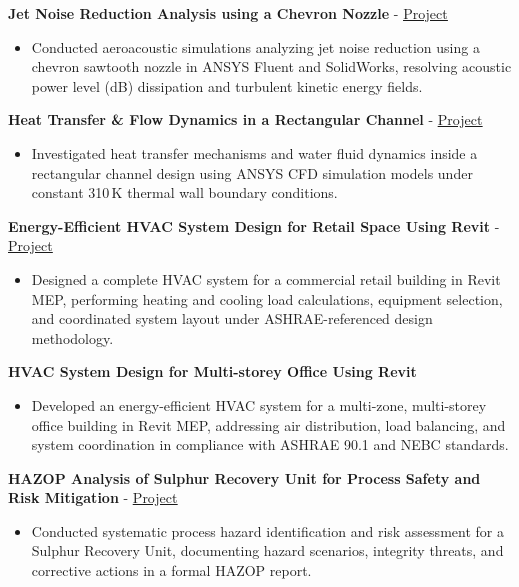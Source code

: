 \documentclass[10pt, letterpaper]{article}
\newcommand{\projhead}[1]{\vspace{5pt}\textbf{#1}\par\vspace{1pt}}
\newcommand{\projheadlink}[3]{\vspace{5pt}\textbf{#1} - \href{#3}{\textcolor{linkblue}{\underline{#2}}}\par\vspace{1pt}}
\begin{document}
\projheadlink{Jet Noise Reduction Analysis using a Chevron Nozzle}{Project}{https://www.linkedin.com/posts/jaykumar-prajapati_cfd-acoustics-jetnoise-activity-7314003365615542273-X1GT}
\begin{itemize}
  \item Conducted aeroacoustic simulations analyzing jet noise reduction using a chevron sawtooth nozzle in ANSYS Fluent and SolidWorks, resolving acoustic power level (dB) dissipation and turbulent kinetic energy fields.
\end{itemize}

\projheadlink{Heat Transfer & Flow Dynamics in a Rectangular Channel}{Project}{https://www.linkedin.com/posts/jaykumar-prajapati_cfd-heattransfer-engineering-activity-7291233894811549696-VFuH}
\begin{itemize}
  \item Investigated heat transfer mechanisms and water fluid dynamics inside a rectangular channel design using ANSYS CFD simulation models under constant 310\,K thermal wall boundary conditions.
\end{itemize}

\projheadlink{Energy-Efficient HVAC System Design for Retail Space Using Revit}{Project}{https://www.linkedin.com/posts/jaykumar-prajapati_hvacdesign-mechanicalengineering-learningjourney-ugcPost-7308550562596237315-Dxny}
\begin{itemize}
  \item Designed a complete HVAC system for a commercial retail building in Revit MEP, performing heating and cooling load calculations, equipment selection, and coordinated system layout under ASHRAE-referenced design methodology.
\end{itemize}

\projhead{HVAC System Design for Multi-storey Office Using Revit}
\begin{itemize}
  \item Developed an energy-efficient HVAC system for a multi-zone, multi-storey office building in Revit MEP, addressing air distribution, load balancing, and system coordination in compliance with ASHRAE 90.1 and NEBC standards.
\end{itemize}

\projheadlink{HAZOP Analysis of Sulphur Recovery Unit for Process Safety and Risk Mitigation}{Project}{https://www.linkedin.com/posts/jaykumar-prajapati_processsafety-hazop-projectmanagement-activity-7324636037656326144-dBnA}
\begin{itemize}
  \item Conducted systematic process hazard identification and risk assessment for a Sulphur Recovery Unit, documenting hazard scenarios, integrity threats, and corrective actions in a formal HAZOP report.
\end{itemize}
\end{document}
